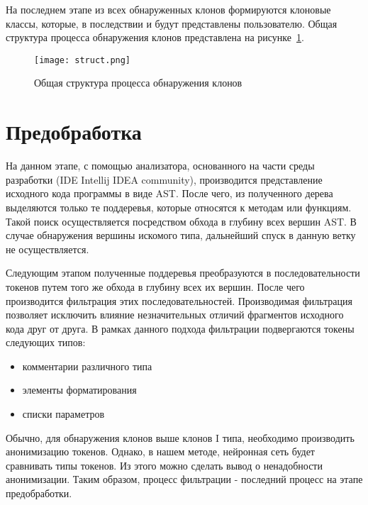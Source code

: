 На последнем этапе из всех обнаруженных клонов формируются клоновые классы, которые, в последствии и будут представлены пользователю. Общая структура процесса обнаружения клонов представлена на рисунке~\ref{fig:struct}.

\begin{figure}[htbp]
\centering
\texttt{[image: struct.png]}
\caption{Общая структура процесса обнаружения клонов}
\label{fig:struct}
\end{figure}

\section{Предобработка}

На данном этапе, с помощью анализатора, основанного на части среды разработки (IDE Intellij IDEA community), производится представление исходного кода программы в виде AST. После чего, из полученного дерева выделяются только те поддеревья, которые относятся к методам или функциям. Такой поиск осуществляется посредством обхода в глубину всех вершин AST. В случае обнаружения вершины искомого типа, дальнейший спуск в данную ветку не осуществляется.


Следующим этапом полученные поддеревья преобразуются в последовательности токенов путем того же обхода в глубину всех их вершин. После чего производится фильтрация этих последовательностей. Производимая фильтрация позволяет исключить влияние незначительных отличий фрагментов исходного кода друг от друга. В рамках данного подхода фильтрации подвергаются токены следующих типов:
\begin{itemize}
\setlength\itemsep{0mm}
\item комментарии различного типа
\item элементы форматирования
\item списки параметров
\end{itemize}

Обычно, для обнаружения клонов выше клонов I типа, необходимо производить анонимизацию токенов. Однако, в нашем методе, нейронная сеть будет сравнивать типы токенов. Из этого можно сделать вывод о ненадобности анонимизации. Таким образом, процесс фильтрации - последний процесс на этапе предобработки.

